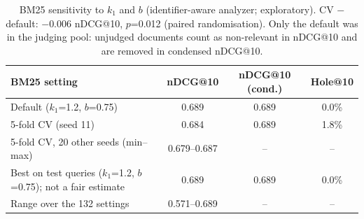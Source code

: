 \begin{table}[t]
\centering
\small
\caption{BM25 sensitivity to $k_1$ and $b$ (identifier-aware analyzer; exploratory). CV $-$ default: $-$0.006 nDCG@10, $p$=0.012 (paired randomisation). Only the default was in the judging pool: unjudged documents count as non-relevant in nDCG@10 and are removed in condensed nDCG@10.}
\label{tab:rq5sweep}
\begin{tabular}{lccc}
\toprule
BM25 setting & nDCG@10 & nDCG@10 (cond.) & Hole@10 \\
\midrule
Default ($k_1$=1.2, $b$=0.75) & 0.689 & 0.689 & 0.0\% \\
5-fold CV (seed 11) & 0.684 & 0.689 & 1.8\% \\
5-fold CV, 20 other seeds (min--max) & 0.679--0.687 & -- & -- \\
Best on test queries ($k_1$=1.2, $b$=0.75); not a fair estimate & 0.689 & 0.689 & 0.0\% \\
Range over the 132 settings & 0.571--0.689 & -- & -- \\
\bottomrule
\end{tabular}
\end{table}

